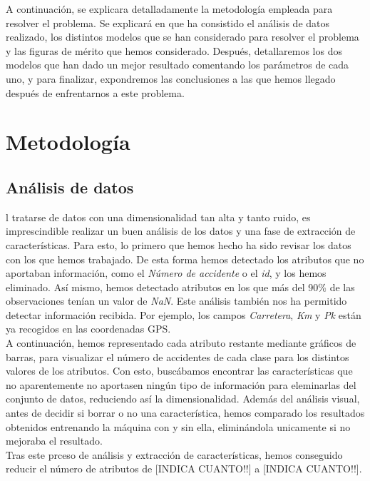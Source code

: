 \documentclass[journal,twoside]{JoPhA}
\begin{document}
A continuación, se explicara detalladamente la metodología empleada para resolver el problema. Se explicará en que ha consistido el análisis de datos realizado, los distintos modelos que se han considerado para resolver el problema y las figuras de mérito que hemos considerado. Después, detallaremos los dos modelos que han dado un mejor resultado comentando los parámetros de cada uno, y para finalizar, expondremos las conclusiones a las que hemos llegado después de enfrentarnos a este problema. \\

\section{Metodología}
\subsection{Análisis de datos}
l tratarse de datos con una dimensionalidad tan alta y tanto ruido, es imprescindible realizar un buen análisis de los datos y una fase de extracción de características. Para esto, lo primero que hemos hecho ha sido revisar los datos con los que hemos trabajado. De esta forma hemos detectado los atributos que no aportaban información, como el \textit{Número de accidente} o el \textit{id}, y los hemos eliminado. Así mismo, hemos detectado atributos en los que más del 90\% de las observaciones tenían un valor de \textit{NaN}. Este análisis también nos ha permitido detectar información recibida. Por ejemplo, los campos \textit{Carretera}, \textit{Km} y \textit{Pk} están ya recogidos en las coordenadas GPS. \\

A continuación, hemos representado cada atributo restante mediante gráficos de barras, para visualizar el número de accidentes de cada clase para los distintos valores de los atributos. Con esto, buscábamos encontrar las características que no aparentemente no aportasen ningún tipo de información para eleminarlas del conjunto de datos, reduciendo así la dimensionalidad. Además del análisis visual, antes de decidir si borrar o no una característica, hemos comparado los resultados obtenidos entrenando la máquina con y sin ella, eliminándola unicamente si no mejoraba el resultado. \\


Tras este prceso de análisis y extracción de características, hemos conseguido reducir el número de atributos de [INDICA CUANTO!!] a [INDICA CUANTO!!]. \\
\end{document}
